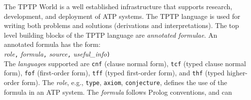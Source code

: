 \documentclass[letterpaper]{article}
\newcommand{\smalltt}[1]{\small \texttt{#1}}
\begin{document}
The TPTP World \cite{Sut17} is a well established infrastructure that supports research, 
development, and deployment of ATP systems.
The TPTP language \cite{Sut22-IGPL} is 
used for writing both problems and solutions (derivations and interpretations).
The top level building blocks of the TPTP language are {\em annotated formulae}.
An annotated formula has the form:\\
{\em role}{\tt ,}
{\em formula}{\tt ,}
{\em source}{\tt ,}
{\em useful\_info}{\tt )}\\
The {\em language}s supported are {\smalltt{cnf}} (clause normal form), {\smalltt{tcf}} (typed
clause normal form), {\smalltt{fof}} (first-order form), {\smalltt{tff}} (typed first-order form), 
and {\smalltt{thf}} (typed higher-order form).
The {\em role}, e.g., {\smalltt{type}}, {\smalltt{axiom}}, {\smalltt{conjecture}}, defines the use 
of the formula in an ATP system.
The {\em formula} follows Prolog conventions, and can
\end{document}
